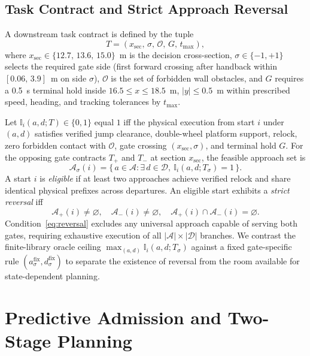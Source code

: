 \documentclass[letterpaper,10pt,conference]{ieeeconf}
\begin{document}
\subsection{Task Contract and Strict Approach Reversal}
A downstream task contract is defined by the tuple
\begin{equation}
  T = (x_{\mathrm{sec}},\,\sigma,\,\mathcal{O},\,G,\,t_{\max}),
  \label{eq:contract}
\end{equation}
where $x_{\mathrm{sec}}\in\{12.7,\,13.6,\,15.0\}$~m is the decision cross-section, $\sigma\in\{-1,+1\}$ selects the required gate side (first forward crossing after handback within $[0.06,\,3.9]$~m on side $\sigma$), $\mathcal{O}$ is the set of forbidden wall obstacles, and $G$ requires a 0.5~s terminal hold inside $16.5\le x\le 18.5$~m, $|y|\le 0.5$~m within prescribed speed, heading, and tracking tolerances by $t_{\max}$.

Let $\mathbb{I}_i(a,d;T)\in\{0,1\}$ equal $1$ iff the physical execution from start $i$ under $(a,d)$ satisfies verified jump clearance, double-wheel platform support, relock, zero forbidden contact with $\mathcal{O}$, gate crossing $(x_{\mathrm{sec}},\sigma)$, and terminal hold $G$. For the opposing gate contracts $T_+$ and $T_-$ at section $x_{\mathrm{sec}}$, the feasible approach set is
\begin{equation}
  \mathcal{A}_\sigma(i) = \bigl\{\,a\in\mathcal{A} : \exists\, d\in\mathcal{D},\ \mathbb{I}_i(a,d;T_\sigma)=1\,\bigr\}.
  \label{eq:feasible_set}
\end{equation}
A start $i$ is \emph{eligible} if at least two approaches achieve verified relock and share identical physical prefixes across departures. An eligible start exhibits a \emph{strict reversal} iff
\begin{equation}
  \mathcal{A}_+(i)\neq\varnothing,\quad
  \mathcal{A}_-(i)\neq\varnothing,\quad
  \mathcal{A}_+(i)\cap\mathcal{A}_-(i)=\varnothing.
  \label{eq:reversal}
\end{equation}
Condition~\eqref{eq:reversal} excludes any universal approach capable of serving both gates, requiring exhaustive execution of all $|\mathcal{A}|\times|\mathcal{D}|$ branches. We contrast the finite-library oracle ceiling $\max_{(a,d)}\mathbb{I}_i(a,d;T_\sigma)$ against a fixed gate-specific rule $(a^{\mathrm{fix}}_\sigma,d^{\mathrm{fix}}_\sigma)$ to separate the existence of reversal from the room available for state-dependent planning.

\section{Predictive Admission and Two-Stage Planning}
\end{document}
